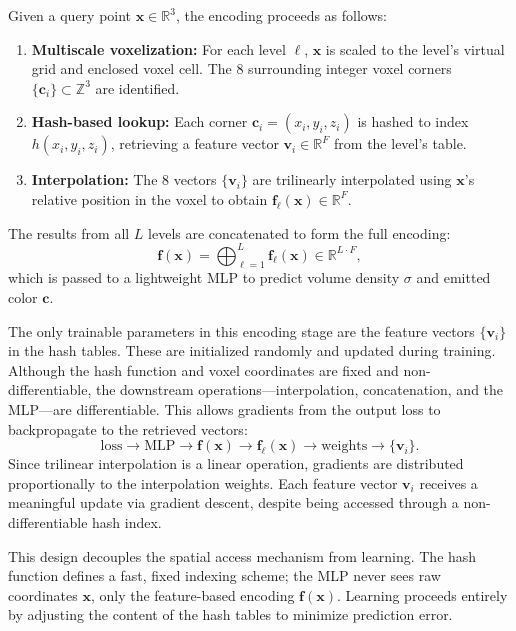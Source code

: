 \begin{enrichment}
\begin{enrichment}
    \medskip
    Given a query point \( \mathbf{x} \in \mathbb{R}^3 \), the encoding proceeds as follows:
    
    \begin{enumerate}
        \item \textbf{Multiscale voxelization:} For each level \( \ell \), \( \mathbf{x} \) is scaled to the level’s virtual grid and enclosed voxel cell. The 8 surrounding integer voxel corners \( \{\mathbf{c}_i\} \subset \mathbb{Z}^3 \) are identified.
        \item \textbf{Hash-based lookup:} Each corner \( \mathbf{c}_i = (x_i, y_i, z_i) \) is hashed to index \( h(x_i, y_i, z_i) \), retrieving a feature vector \( \mathbf{v}_i \in \mathbb{R}^F \) from the level's table.
        \item \textbf{Interpolation:} The 8 vectors \( \{\mathbf{v}_i\} \) are trilinearly interpolated using \( \mathbf{x} \)'s relative position in the voxel to obtain \( \mathbf{f}_\ell(\mathbf{x}) \in \mathbb{R}^F \).
    \end{enumerate}
    
    The results from all \( L \) levels are concatenated to form the full encoding:
    \[
    \mathbf{f}(\mathbf{x}) = \bigoplus_{\ell=1}^L \mathbf{f}_\ell(\mathbf{x}) \in \mathbb{R}^{L \cdot F},
    \]
    which is passed to a lightweight MLP to predict volume density \( \sigma \) and emitted color \( \mathbf{c} \).
    
    \medskip
    The only trainable parameters in this encoding stage are the feature vectors \( \{\mathbf{v}_i\} \) in the hash tables. These are initialized randomly and updated during training. Although the hash function and voxel coordinates are fixed and non-differentiable, the downstream operations—interpolation, concatenation, and the MLP—are differentiable. This allows gradients from the output loss to backpropagate to the retrieved vectors:
    \[
    \text{loss} \rightarrow \text{MLP} \rightarrow \mathbf{f}(\mathbf{x}) \rightarrow \mathbf{f}_\ell(\mathbf{x}) \rightarrow \text{weights} \rightarrow \{ \mathbf{v}_i \}.
    \]
    Since trilinear interpolation is a linear operation, gradients are distributed proportionally to the interpolation weights. Each feature vector \( \mathbf{v}_i \) receives a meaningful update via gradient descent, despite being accessed through a non-differentiable hash index.
    
    \medskip
    This design decouples the spatial access mechanism from learning. The hash function defines a fast, fixed indexing scheme; the MLP never sees raw coordinates \( \mathbf{x} \), only the feature-based encoding \( \mathbf{f}(\mathbf{x}) \). Learning proceeds entirely by adjusting the content of the hash tables to minimize prediction error.
    

\end{enrichment}
\end{enrichment}
